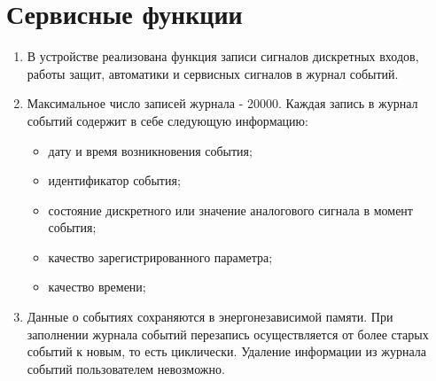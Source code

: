 \color{unidarkgreen}\section[Сервисные функции]{Сервисные функции}\label{sec:servfuncs}
\color{black}


\color{black}

\begin{enumerate}[label=\arabic{section}.\arabic{subsection}.\arabic*, labelsep=4pt, leftmargin=0pt, itemindent=57pt]

\item
В устройстве реализована функция записи сигналов дискретных входов, работы защит, автоматики и сервисных сигналов в журнал событий.
\item
Максимальное число записей журнала - 20000. Каждая запись в журнал событий содержит в себе следующую информацию:
\begin{itemize}
    \item дату и время возникновения события;
    \item идентификатор события;
    \item состояние дискретного или значение аналогового сигнала в момент события;
    \item качество зарегистрированного параметра;
    \item качество времени;
\end{itemize}
\item
Данные о событиях сохраняются в энергонезависимой памяти.
При заполнении журнала событий перезапись осуществляется от более старых событий к новым, то есть циклически.
Удаление информации из журнала событий пользователем невозможно.

\end{enumerate}


\color{black}

